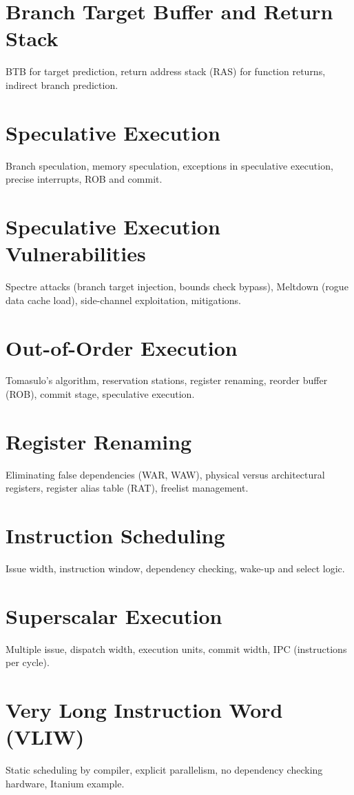 \chapter{Branch Target Buffer and Return Stack}
BTB for target prediction, return address stack (RAS) for function returns, indirect branch prediction.

\chapter{Speculative Execution}
Branch speculation, memory speculation, exceptions in speculative execution, precise interrupts, ROB and commit.

\chapter{Speculative Execution Vulnerabilities}
Spectre attacks (branch target injection, bounds check bypass), Meltdown (rogue data cache load), side-channel exploitation, mitigations.

\chapter{Out-of-Order Execution}
Tomasulo's algorithm, reservation stations, register renaming, reorder buffer (ROB), commit stage, speculative execution.

\chapter{Register Renaming}
Eliminating false dependencies (WAR, WAW), physical versus architectural registers, register alias table (RAT), freelist management.

\chapter{Instruction Scheduling}
Issue width, instruction window, dependency checking, wake-up and select logic.

\chapter{Superscalar Execution}
Multiple issue, dispatch width, execution units, commit width, IPC (instructions per cycle).

\chapter{Very Long Instruction Word (VLIW)}
Static scheduling by compiler, explicit parallelism, no dependency checking hardware, Itanium example.

